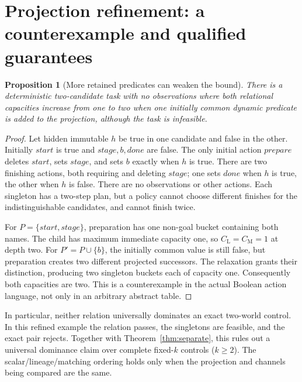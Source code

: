 \documentclass[11pt]{article}
\newtheorem{proposition}[theorem]{Proposition}
\theoremstyle{definition}
\newcommand{\CL}{C_{\mathrm L}}
\newcommand{\CM}{C_{\mathrm M}}
\begin{document}
\section{Projection refinement: a counterexample and qualified guarantees}
\begin{proposition}[More retained predicates can weaken the bound]\label{prop:counter}
There is a deterministic two-candidate task with no observations where both
relational capacities increase from one to two when one initially common
dynamic predicate is added to the projection, although the task is infeasible.
\end{proposition}
\begin{proof}
Let hidden immutable $h$ be true in one candidate and false in the other.
Initially $start$ is true and $stage,b,done$ are false. The only initial action
$prepare$ deletes $start$, sets $stage$, and sets $b$ exactly when $h$ is true.
There are two finishing actions, both requiring and deleting $stage$; one sets
$done$ when $h$ is true, the other when $h$ is false. There are no observations
or other actions. Each singleton has a two-step plan, but a policy cannot choose
different finishes for the indistinguishable candidates, and cannot finish twice.

For $P=\{start,stage\}$, preparation has one non-goal bucket containing both
names. The child has maximum immediate capacity one, so $\CL=\CM=1$ at depth
two. For $P'=P\cup\{b\}$, the initially common value is still false, but
preparation creates two different projected successors. The relaxation grants
their distinction, producing two singleton buckets each of capacity one.
Consequently both capacities are two. This is a counterexample in the actual
Boolean action language, not only in an arbitrary abstract table.
\end{proof}
In particular, neither relation universally dominates an exact two-world
control. In this refined example the relation passes, the singletons are
feasible, and the exact pair rejects. Together with
Theorem~\ref{thm:separate}, this rules out a universal dominance claim over
complete fixed-$k$ controls ($k\geq2$). The scalar/lineage/matching ordering
holds only when the projection and channels being compared are the same.
\end{document}
